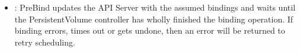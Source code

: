 \begin{itemize}
\begin{itemize}
            \end{itemize}
      \item {}: PreBind updates the API Server with the assumed
            bindings and waits until the PersistentVolume controller has wholly
            finished the binding operation. If binding errors, times out or gets
            undone, then an error will be returned to retry scheduling.
\end{itemize}
